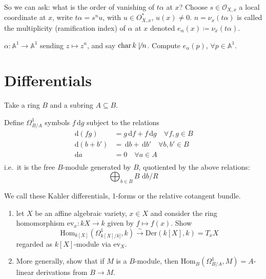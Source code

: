 \documentclass{article}
\newcommand{\A}{\mathbb{A}}
\newcommand{\diff}{\,\textrm{d}}
\DeclareMathOperator{\chara}{char}
\begin{document}
So we can ask: what is the order of vanishing of $t\alpha$ at $x$?
Choose $s \in \mathcal{O}_{X, x}$ a local coordinate at $x$, write $t\alpha = s^n u$, with $u \in O_{X, x}^*$, $u(x) \neq 0$.
$n = \nu_x(t \alpha)$ is called the multiplicity (ramification index) of $\alpha$ at $x$ denoted $e_\alpha(x) \coloneqq \nu_x(t\alpha)$.
\begin{eg}
    $\alpha: \A^1 \to \A^1$ sending $z \mapsto z^n$, and say $\chara k \not\mid n$. Compute $e_\alpha(p)$, $\forall p \in \A^1$.
\end{eg}

\section{Differentials}
Take a ring $B$ and a subring $A \subseteq B$.
\begin{defi}
    Define $\Omega_{B/A}^1$ symbols $f \diff g$ subject to the relations
    \begin{align*}
        \diff(fg) &= g \diff f + f \diff g \quad \forall f, g \in B\\
        \diff(b + b') &= \diff b + \diff b' \quad \forall b, b' \in B\\
        \diff a &= 0 \quad \forall a \in A \\
    \end{align*}
    i.e.\ it is the free $B$-module generated by $B$, quotiented by the above relations:
    \begin{equation*}
        \bigoplus_{b \in B} B \, \diff b / R
    \end{equation*}

    We call these Kahler differentials, 1-forms or the relative cotangent bundle.
\end{defi}
\begin{ex}
    \leavevmode
    \begin{enumerate}[label=(\alph*)]
        \item let $X$ be an affine algebraic variety, $x \in X$ and consider the ring homomorphism $\text{ev}_x: k{X} \to k$ given by $f \mapsto f(x)$.
            Show
            \begin{equation*}
                \text{Hom}_{k[X]}(\Omega^1_{k[X]/k]}, k) \xrightarrow{\sim} \text{Der}(k[X], k) = T_x X
            \end{equation*}
            regarded as $k[X]$-module via $\text{ev}_X$.

        \item More generally, show that if
            $M$ is a $B$-module, then $\text{Hom}_B(\Omega^1_{B/A}, M) = A$-linear derivations from $B \to M$.
    \end{enumerate}
\end{ex}
\end{document}
